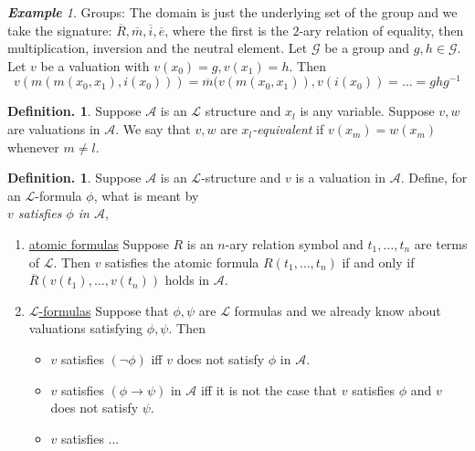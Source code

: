 \documentclass[a4paper,oneside,11pt,DIV=12,parskip=half]{scrartcl}
\newcommand{\LL}{\mathcal L}
\theoremstyle{plain}
\theoremstyle{definition}
\newtheorem{definition}[theorem]{Definition.}
\newtheorem{remark, definition}[theorem]{Remark and Definition.}
\newtheorem{lemma, definition}[theorem]{Lemma and Definition.}
\newtheorem{theorem, definition}[theorem]{Theorem and Definition.}
\theoremstyle{remark}
\newtheorem*{example}{\textbf{Example}}
\newtheorem*{remark, example}{\textbf{Remark and Exercise}}
\begin{document}
\begin{example}
Groups:  The domain is just the underlying set of the group and we take the signature: $\overline{R},\overline{m},\overline{i},\overline{e}$, where the first is the $2$-ary relation of equality, then multiplication, inversion and the neutral element.
Let $\mathcal{G}$ be a group and $g,h \in \mathcal{G}$. Let $v$ be a valuation with $ v(x_0) = g, v(x_1)=h$. Then 
\[ v(m(m(x_0,x_1),i(x_0))) = \overline{m}(v(m(x_0,x_1)),v(i(x_0)) = \dots = ghg^{-1} \]
\end{example}

\begin{definition}
 Suppose $\mathcal{A}$ is an $\LL$ structure and $x_l$ is any variable. Suppose $v,w$ are valuations in $\mathcal{A}$. We say that $v,w$ are \emph{$x_l$-equivalent} if $v(x_m) = w(x_m)$ whenever $m \neq l$.
\end{definition}

\begin{definition}
 Suppose $\mathcal{A}$ is an $\LL$-structure and $v$ is a valuation in $\mathcal{A}$.
 Define, for an $\LL$-formula $\phi$, what is meant by \\
\emph{$v$ satisfies $\phi$ in $\mathcal{A}$},
\begin{enumerate}
    \item \underline{atomic formulas}
    Suppose $R$ is an $n$-ary relation symbol and $t_1,\dots,t_n$ are terms of $\LL$. Then $v$ satisfies the atomic formula $R(t_1,\dots,t_n)$ if and only if $\overline{R}(v(t_1),\dots,v(t_n))$ holds in $\mathcal{A}$.
    \item \underline{$\LL$-formulas}
    Suppose that $\phi,\psi$ are $\LL$ formulas and we already know about valuations satisfying $\phi,\psi$. Then
    \begin{itemize}
        \item $v$ satisfies $(\lnot \phi) $ iff $v$ does not satisfy $\phi$ in $\mathcal{A}$.
        \item $v$ satisfies $(\phi \rightarrow \psi)$ in $\mathcal{A}$ iff it is not the case that $v$ satisfies $\phi$ and $v$ does not satisfy $\psi$.
        \item $v$ satisfies $\dots$
    \end{itemize}
\end{enumerate}
\end{definition}
\end{document}
